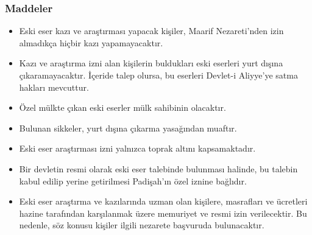 \subsubsection{Maddeler}
\begin{itemize}
    \item Eski eser kazı ve araştırması yapacak kişiler, Maarif Nezareti'nden izin almadıkça hiçbir kazı yapamayacaktır.
    \item Kazı ve araştırma izni alan kişilerin buldukları eski eserleri yurt dışına çıkaramayacaktır. İçeride talep olursa, bu eserleri Devlet-i Aliyye'ye satma hakları mevcuttur.
    \item Özel mülkte çıkan eski eserler mülk sahibinin olacaktır.
    \item Bulunan sikkeler, yurt dışına çıkarma yasağından muaftır.
    \item Eski eser araştırması izni yalnızca toprak altını kapsamaktadır.
    \item Bir devletin resmi olarak eski eser talebinde bulunması halinde, bu talebin kabul edilip yerine getirilmesi Padişah'ın özel iznine bağlıdır.
    \item Eski eser araştırma ve kazılarında uzman olan kişilere, masrafları ve ücretleri hazine tarafından karşılanmak üzere memuriyet ve resmi izin verilecektir. Bu nedenle, söz konusu kişiler ilgili nezarete başvuruda bulunacaktır.
\end{itemize}